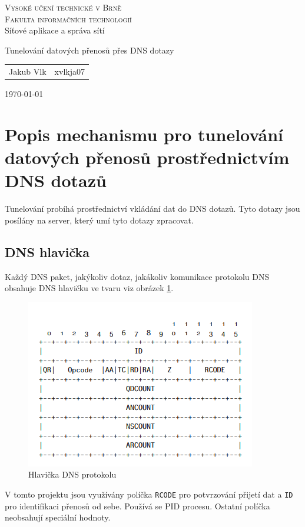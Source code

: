 \documentclass[11pt]{article}
\begin{document}
\begin{titlepage}
\begin{center}
    \Huge
    \textsc{Vysoké učení technické v Brně\\
    \huge
    Fakulta informačních technologií}\\
    \LARGE
     Síťové aplikace a správa sítí
    
    \Huge
    Tunelování datových přenosů přes DNS dotazy
    
       \begin{table}[h]
        \centering
        \Large
        \begin{tabular}{rl}
            {Jakub Vlk} & {xvlkja07} \\
        \end{tabular}
    \end{table}
    \vfill
    \Large
    \today
\end{center}
\end{titlepage}

\tableofcontents

\newpage

\section{Popis mechanismu pro tunelování datových přenosů prostřednictvím DNS dotazů}
Tunelování probíhá prostřednictví vkládání dat do DNS dotazů. Tyto dotazy jsou posílány na server, který umí tyto dotazy zpracovat. 
\subsection{DNS hlavička}

Každý DNS paket, jakýkoliv dotaz, jakákoliv komunikace protokolu DNS obsahuje DNS hlavičku ve tvaru viz obrázek \ref{obrz1}.
\begin{figure}[H]
\begin{center}
 \includegraphics{img/DNSheader.png}
 \caption{Hlavička DNS protokolu}
 \label{obrz1}
 \end{center}
 \end{figure}
V tomto projektu jsou využívány políčka \texttt{RCODE} pro potvrzování přijetí dat a  \label{ID} \texttt{ID} pro identifikaci přenosů od sebe. Používá se PID procesu. Ostatní políčka neobsahují speciální hodnoty. 
\end{document}
